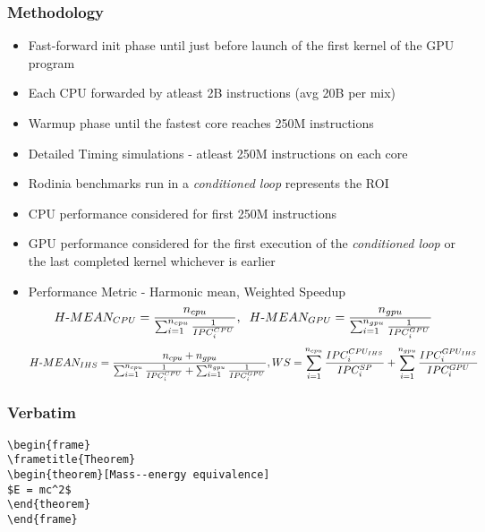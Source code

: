 \documentclass{beamer}
\begin{document}
\begin{frame}
\frametitle{Methodology}
\begin{itemize}
	\item Fast-forward init phase until just before launch of the first kernel of the GPU program
	\item Each CPU forwarded by atleast 2B instructions (avg 20B per mix)
	\item Warmup phase until the fastest core reaches 250M instructions
	\item Detailed Timing simulations - atleast 250M instructions on each core
	\item Rodinia benchmarks run in a \textit{conditioned loop} represents the ROI
	\item CPU performance considered for first 250M instructions
	\item GPU performance considered for the first execution of the \textit{conditioned loop} or the last completed kernel whichever is earlier
	\item Performance Metric - Harmonic mean, Weighted Speedup
	{\scriptsize
		\begin{equation*}
		H\textnormal{-}MEAN_{CPU} = \frac{n_{cpu}}{\sum_{i=1}^{n_{cpu}} \frac{1}{IPC_{i}^{CPU}}}, \hspace{0.2cm} H\textnormal{-}MEAN_{GPU} = \frac{n_{gpu}}{\sum_{i=1}^{n_{gpu}} \frac{1}{IPC_{i}^{GPU}}} 
		\end{equation*}
	}
	{\scriptsize
		\begin{equation*}
		H\textnormal{-}MEAN_{IHS} = \frac{n_{cpu}+ n_{gpu}}{\sum_{i=1}^{n_{cpu}} \frac{1}{IPC_{i}^{CPU}} + \sum_{i=1}^{n_{gpu}} \frac{1}{IPC_{i}^{GPU}}}, 
		WS = \sum_{i=1}^{n_{cpu}} \frac{IPC_i^{CPU_{IHS}}}{IPC_i^{SP}} + \sum_{i=1}^{n_{gpu}} \frac{IPC_i^{GPU_{IHS}}}{IPC_i^{GPU}}
		\end{equation*}
	}
\end{itemize}
\end{frame}


\begin{frame}[fragile] %
\frametitle{Verbatim}
\begin{example}
\begin{verbatim}
\begin{frame}
\frametitle{Theorem}
\begin{theorem}[Mass--energy equivalence]
$E = mc^2$
\end{theorem}
\end{frame}\end{verbatim}
\end{example}
\end{frame}
\end{document}
